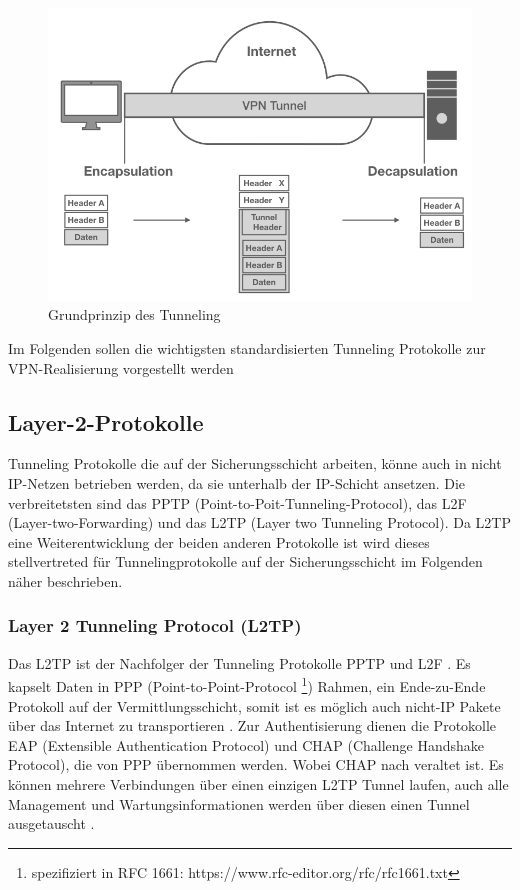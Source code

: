 \begin{figure}[h]
	\includegraphics[width=\linewidth]{tunneling}
	\caption{Grundprinzip des Tunneling}
	\label{tunnel}
\end{figure}

 Im Folgenden sollen die wichtigsten standardisierten  Tunneling Protokolle zur VPN-Realisierung vorgestellt werden

\subsection{Layer-2-Protokolle}
Tunneling Protokolle die auf der Sicherungsschicht arbeiten, könne auch in nicht IP-Netzen betrieben werden, da sie unterhalb der IP-Schicht ansetzen. Die verbreitetsten sind das PPTP (Point-to-Poit-Tunneling-Protocol), das L2F  (Layer-two-Forwarding) und das L2TP (Layer two Tunneling Protocol). Da L2TP eine Weiterentwicklung der beiden anderen Protokolle ist \cite{lipp2007vpn} wird dieses stellvertreted für Tunnelingprotokolle auf der Sicherungsschicht im Folgenden näher beschrieben.


\subsubsection{Layer 2 Tunneling Protocol (L2TP)}
Das L2TP ist der Nachfolger der Tunneling Protokolle PPTP und L2F \cite{isi-vpn}. Es kapselt Daten in PPP (Point-to-Point-Protocol \footnote{spezifiziert in RFC 1661: https://www.rfc-editor.org/rfc/rfc1661.txt}) Rahmen, ein Ende-zu-Ende Protokoll auf der Vermittlungsschicht, somit ist es möglich auch nicht-IP Pakete über das Internet zu transportieren \cite{gokulakrishnan2014survey}. Zur Authentisierung dienen die Protokolle EAP (Extensible Authentication Protocol) und CHAP (Challenge Handshake Protocol), die von PPP übernommen werden. Wobei CHAP nach \cite{eckert2018sicherheit} veraltet ist. 
Es können mehrere Verbindungen über einen einzigen L2TP Tunnel laufen, auch alle Management und Wartungsinformationen werden über diesen einen Tunnel ausgetauscht \cite{bohmer2005vpn}.

